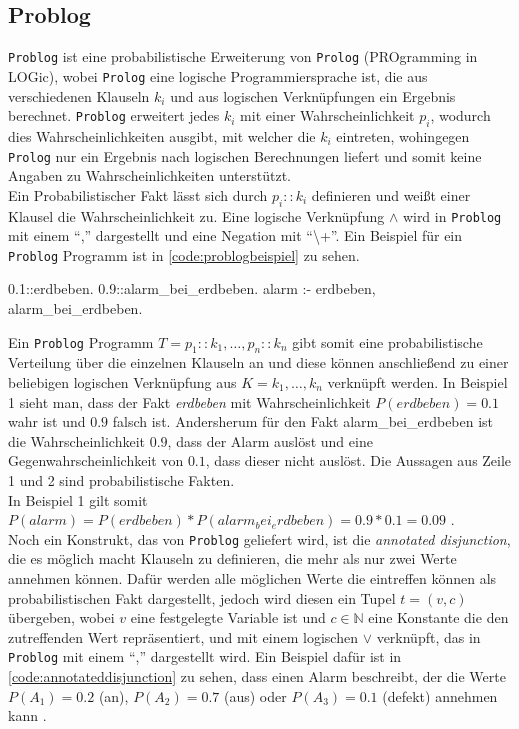 \documentclass[german,version-2020-11]{uzl-thesis}
\begin{document}
\subsection{Problog}
\texttt{Problog} ist eine probabilistische Erweiterung von \texttt{Prolog} (PROgramming in LOGic), wobei \texttt{Prolog} eine logische Programmiersprache ist, die aus verschiedenen Klauseln $k_i$ und aus logischen Verknüpfungen ein Ergebnis berechnet. \texttt{Problog} erweitert jedes $k_i$ mit einer Wahrscheinlichkeit $p_i$, wodurch dies Wahrscheinlichkeiten ausgibt, mit welcher die $k_i$ eintreten, wohingegen \texttt{Prolog} nur ein Ergebnis nach logischen Berechnungen liefert und somit keine Angaben zu Wahrscheinlichkeiten unterstützt. \\  Ein Probabilistischer Fakt lässt sich durch $p_i :: k_i$ definieren und weißt einer Klausel die Wahrscheinlichkeit zu. Eine logische Verknüpfung $\land$ wird in \texttt{Problog} mit einem \enquote{,} dargestellt und eine Negation mit  \enquote{\textbackslash+}. Ein Beispiel für ein \texttt{Problog} Programm ist in \autoref{code:problogbeispiel} zu sehen.
\begin{Pseudocode}[caption={\texttt{Problog} Programm-Beispiel}, label={code:problogbeispiel}, numbers=left]
0.1::erdbeben.
0.9::alarm_bei_erdbeben.
alarm :- erdbeben, alarm_bei_erdbeben.
\end{Pseudocode} 
Ein \texttt{Problog} Programm $T = {p_1 :: k_1, \dots, p_n :: k_n}$ gibt somit eine probabilistische Verteilung über die einzelnen Klauseln an und diese können anschließend zu einer beliebigen logischen Verknüpfung aus $K = {k_1 , \dots , k_n}$ verknüpft werden. In Beispiel 1 sieht man, dass der Fakt \textit{erdbeben} mit Wahrscheinlichkeit $ P(erdbeben) = 0.1$ wahr ist und $0.9$ falsch ist. Andersherum für den Fakt alarm\_bei\_erdbeben ist die Wahrscheinlichkeit $0.9$, dass der Alarm auslöst und eine Gegenwahrscheinlichkeit von $0.1$, dass dieser nicht auslöst. Die Aussagen aus Zeile 1 und 2 sind probabilistische Fakten.\\  In Beispiel 1 gilt somit $P(alarm) = P(erdbeben) * P(alarm_bei_erdbeben) = 0.9 * 0.1 = 0.09$ \cite{4}\cite{5}. \\ 
Noch ein Konstrukt, das von \texttt{Problog} geliefert wird, ist die \textit{annotated disjunction}, die es möglich macht Klauseln zu definieren, die mehr als nur zwei Werte annehmen können. Dafür werden alle möglichen Werte die eintreffen können als probabilistischen Fakt dargestellt, jedoch wird diesen ein Tupel $t = (v,c) $ übergeben, wobei $v$ eine festgelegte Variable ist und $c \in \mathbb{N}$ eine Konstante die den zutreffenden Wert repräsentiert, und  mit einem logischen $\lor$ verknüpft, das in \texttt{Problog} mit einem \enquote{,} dargestellt wird. Ein Beispiel dafür ist in \autoref{code:annotateddisjunction} zu sehen, dass einen Alarm beschreibt, der die Werte $P(A_1) = 0.2$ (an), $P(A_2) = 0.7$ (aus) oder $P(A_3) = 0.1$ (defekt) annehmen kann \cite{5}.
\end{document}
